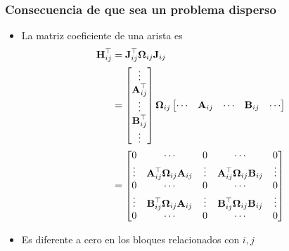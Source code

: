 \begin{frame}
    \frametitle{Consecuencia de que sea un problema disperso}
    \small
    \begin{itemize}
        \item La matriz coeficiente de una arista es
        \begin{align*}
            \boldsymbol{\mathbf{H}}_{ij}^{\top} &= \boldsymbol{\mathbf{J}}_{ij}^{\top}\boldsymbol{\mathbf{\Omega}}_{ij}\boldsymbol{\mathbf{J}}_{ij}\\
            &= 
            \begin{bmatrix}
                \vdots \\
                \boldsymbol{\mathbf{A}}_{ij}^{\top}\\
                \vdots \\
                \boldsymbol{\mathbf{B}}_{ij}^{\top}\\
                \vdots
            \end{bmatrix} \boldsymbol{\mathbf{\Omega}}_{ij}
            \begin{bmatrix}
                \cdots & \boldsymbol{\mathbf{A}}_{ij} & \cdots & \boldsymbol{\mathbf{B}}_{ij} & \cdots
            \end{bmatrix}\\
            &= 
            \begin{bmatrix}
                0 & \cdots & 0 & \cdots & 0 \\
                \vdots & \boldsymbol{\mathbf{A}}_{ij}^{\top}\boldsymbol{\mathbf{\Omega}}_{ij}\boldsymbol{\mathbf{A}}_{ij} & \vdots & \boldsymbol{\mathbf{A}}_{ij}^{\top}\boldsymbol{\mathbf{\Omega}}_{ij}\boldsymbol{\mathbf{B}}_{ij} & \vdots\\
                0 & \cdots & 0 & \cdots & 0 \\
                \vdots & \boldsymbol{\mathbf{B}}_{ij}^{\top}\boldsymbol{\mathbf{\Omega}}_{ij}\boldsymbol{\mathbf{A}}_{ij} & \vdots & \boldsymbol{\mathbf{B}}_{ij}^{\top}\boldsymbol{\mathbf{\Omega}}_{ij}\boldsymbol{\mathbf{B}}_{ij} & \vdots\\
                0 & \cdots & 0 & \cdots & 0
            \end{bmatrix}
        \end{align*}
        \item Es diferente a cero en los bloques relacionados con $i,j$
    \end{itemize}
    
\end{frame}


